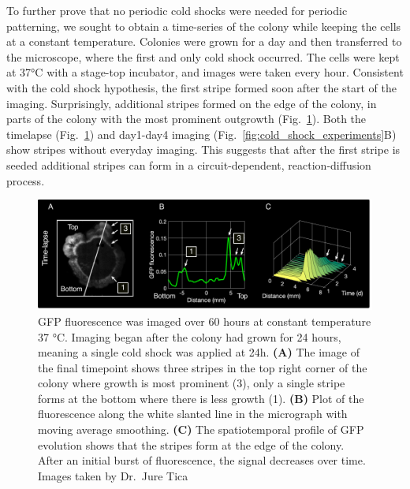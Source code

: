 To further prove that no periodic cold shocks were needed for periodic patterning, we sought to obtain a time-series of the colony while keeping the cells at a constant temperature.
Colonies were grown for a day and then transferred to the microscope, where the first and only cold shock occurred.
The cells were kept at 37°C with a stage-top incubator, and images were taken every hour.
Consistent with the cold shock hypothesis, the first stripe formed soon after the start of the imaging.
Surprisingly, additional stripes formed on the edge of the colony, in parts of the colony with the most prominent outgrowth (Fig.~\ref{fig:microscopy_timeseries}).
Both the timelapse (Fig.~\ref{fig:microscopy_timeseries}) and day1-day4 imaging (Fig.~\ref{fig:cold_shock_experiments}B) show stripes without everyday imaging.
This suggests that after the first stripe is seeded additional stripes can form in a circuit-dependent, reaction-diffusion process.


\begin{figure}[H] %
    \centering
    \begin{adjustbox}{center}
        \includegraphics[width=1.1\textwidth]{chapters/Chapter 3/microscopy_timeseries} %
    \end{adjustbox}
    \caption{GFP fluorescence was imaged over 60 hours at constant temperature 37 °C. Imaging began after the colony had grown for 24 hours, meaning a single cold shock was applied at 24h. \textbf{(A)} The image of the final timepoint shows three stripes in the top right corner of the colony where growth is most prominent (3), only a single stripe forms at the bottom where there is less growth (1). \textbf{(B)} Plot of the fluorescence along the white slanted line in the micrograph with moving average smoothing. \textbf{(C)} The spatiotemporal profile of GFP evolution shows that the stripes form at the edge of the colony. After an initial burst of fluorescence, the signal decreases over time. Images taken by Dr.~Jure Tica}
    \label{fig:microscopy_timeseries}
\end{figure}



